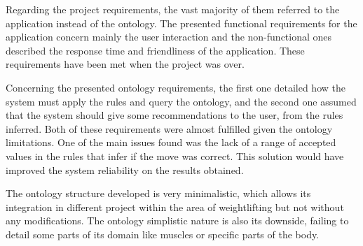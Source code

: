 Regarding the project requirements, the vast majority of them referred to the application instead of the ontology. The presented functional requirements for the application concern mainly the user interaction and the non-functional ones described the response time and friendliness of the application. These requirements have been met when the project was over.

Concerning the presented ontology requirements, the first one detailed how the system must apply the rules and query the ontology, and the second one assumed that the system should give some recommendations to the user, from the rules inferred. Both of these requirements were almost fulfilled given the ontology limitations. One of the main issues found was the lack of a range of accepted values in the rules that infer if the move was correct. This solution would have improved the system reliability on the results obtained.

The ontology structure developed is very minimalistic, which allows its integration in different project within the area of weightlifting but not without any modifications. The ontology simplistic nature is also its downside, failing to detail some parts of its domain like muscles or specific parts of the body.